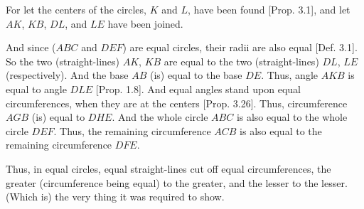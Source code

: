 \begin{Parallel}{}{}
{\epsfysize=1.6in
\centerline{}

For let the centers of the circles, $K$ and $L$, have been found [Prop. 3.1],
and let $AK$, $KB$, $DL$, and $LE$ have been joined.

And since ($ABC$ and $DEF$) are equal circles, their radii are also equal [Def. 3.1]. So the two
(straight-lines) $AK$, $KB$ are equal to the two (straight-lines) $DL$, $LE$ (respectively).
And the base $AB$ (is) equal to the base $DE$. Thus, angle $AKB$ is equal
to angle $DLE$ [Prop. 1.8]. And equal angles stand upon equal circumferences,
when they are at the centers [Prop. 3.26]. Thus, circumference $AGB$
(is) equal to $DHE$. And the whole circle $ABC$ is also equal to the whole
circle $DEF$. Thus, the remaining circumference $ACB$
is also equal to the remaining circumference $DFE$.

Thus, in equal circles, equal straight-lines cut off equal circumferences, 
the greater (circumference being equal) to the greater, and the lesser to the lesser. (Which is) the very thing it was required to show.}
\end{Parallel}

